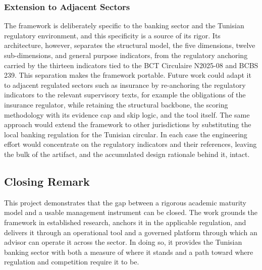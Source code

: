 \subsubsection{Extension to Adjacent Sectors}

The framework is deliberately specific to the banking sector and the Tunisian regulatory environment, and this specificity is a source of its rigor. Its architecture, however, separates the structural model, the five dimensions, twelve sub-dimensions, and general purpose indicators, from the regulatory anchoring carried by the thirteen indicators tied to the BCT Circulaire N\textdegree{}2025-08 and BCBS 239. This separation makes the framework portable. Future work could adapt it to adjacent regulated sectors such as insurance by re-anchoring the regulatory indicators to the relevant supervisory texts, for example the obligations of the insurance regulator, while retaining the structural backbone, the scoring methodology with its evidence cap and skip logic, and the tool itself. The same approach would extend the framework to other jurisdictions by substituting the local banking regulation for the Tunisian circular. In each case the engineering effort would concentrate on the regulatory indicators and their references, leaving the bulk of the artifact, and the accumulated design rationale behind it, intact.

\subsection{Closing Remark}

This project demonstrates that the gap between a rigorous academic maturity model and a usable management instrument can be closed. The work grounds the framework in established research, anchors it in the applicable regulation, and delivers it through an operational tool and a governed platform through which an advisor can operate it across the sector. In doing so, it provides the Tunisian banking sector with both a measure of where it stands and a path toward where regulation and competition require it to be.
